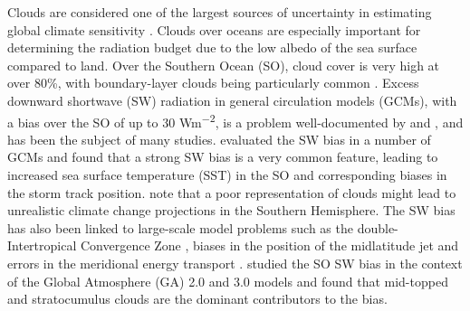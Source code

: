 Clouds are considered one of the largest sources of uncertainty in estimating
global climate sensitivity \citep{boucher2013,flato2013,bony2015}. Clouds over
oceans are especially important for determining the radiation budget due to the
low albedo of the sea surface compared to land. Over the Southern Ocean (SO),
cloud cover is very high at over 80\%, with boundary-layer clouds being
particularly common \citep{mace2009}. Excess downward shortwave (SW) radiation
in general circulation models (GCMs), with a bias over the SO of up to 30
\unit{Wm^{-2}}, is a problem well-documented by \cite{trenberth2010} and
\cite{hyder2018}, and has been the subject of many studies.
\cite{bodas-salcedo2014} evaluated the SW bias in a number of GCMs and found
that a strong SW bias is a very common feature, leading to increased sea surface
temperature (SST) in the SO and corresponding biases in the storm track
position. \cite{trenberth2010} note that a poor representation of clouds might
lead to unrealistic climate change projections in the Southern Hemisphere. The
SW bias has also been linked to large-scale model problems such as the
double-Intertropical Convergence Zone \citep{hwang2013}, biases in the position
of the midlatitude jet \citep{ceppi2012} and errors in the meridional energy
transport \citep{mason2014}. \cite{bodas-salcedo2012} studied the SO SW bias in
the context of the Global Atmosphere (GA) 2.0 and 3.0 models and found that
mid-topped and stratocumulus clouds are the dominant contributors to the bias.

